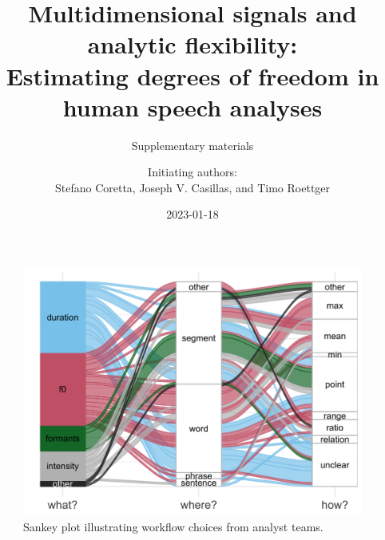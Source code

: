 \documentclass[
]{article}
\title{Multidimensional signals and analytic flexibility:\\
Estimating degrees of freedom in human speech analyses}
\subtitle{Supplementary materials}
\author{Initiating authors:\\
Stefano Coretta, Joseph V. Casillas, and Timo Roettger}
\date{2023-01-18}
\begin{document}
\maketitle

\begin{figure}
\includegraphics[width=1\linewidth]{./figs/flow_outcome} \caption{Sankey plot illustrating workflow choices from analyst teams.}\label{fig:sankey-plot}
\end{figure}
\end{document}

